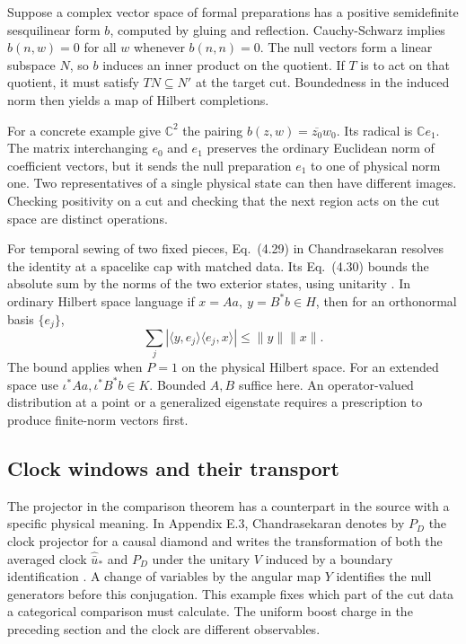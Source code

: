 \documentclass[11pt,letterpaper]{article}
\newcommand{\CC}{\mathbb C}
\begin{document}
Suppose a complex vector space of formal preparations has a
positive semidefinite sesquilinear form \(b\), computed by gluing and reflection.
Cauchy-Schwarz implies \(b(n,w)=0\) for all \(w\) whenever \(b(n,n)=0\).
The null vectors form a linear subspace \(N\), so \(b\) induces an inner
product on the quotient. If \(T\) is to act on that quotient, it must
satisfy \(T N\subseteq N'\) at the target cut. Boundedness in the induced
norm then yields a map of Hilbert completions.

For a concrete example give \(\CC^2\) the pairing
\(b(z,w)=\overline{z_0}w_0\). Its radical is \(\CC e_1\). The matrix
interchanging \(e_0\) and \(e_1\) preserves the ordinary Euclidean norm of
coefficient vectors, but it sends the null preparation \(e_1\) to one of
physical norm one. Two representatives of a single physical state can then
have different images. Checking positivity on a cut and checking that the
next region acts on the cut space are distinct operations.

For temporal sewing of two fixed pieces, Eq.~(4.29) in Chandrasekaran
resolves the identity at a spacelike cap with matched data. Its Eq.~(4.30)
bounds the absolute sum by the norms of the two exterior states, using
unitarity \cite[Sec.~4.4]{nc}. In ordinary Hilbert space language if
\(x=Aa,\ y=B^*b\in H\), then for an orthonormal basis \(\{e_j\}\),
\begin{equation}
 \sum_j|\langle y,e_j\rangle\langle e_j,x\rangle|
       \leq \|y\|\|x\|.
 \label{eq:cauchy}
\end{equation}
The bound applies when \(P=1\) on the physical Hilbert space. For an extended
space use \(\iota^*Aa,\iota^*B^*b\in K\). Bounded \(A,B\) suffice here.
An operator-valued distribution at a point or a generalized eigenstate
requires a prescription to produce finite-norm vectors first.

\subsection{Clock windows and their transport}
The projector in the comparison theorem has a counterpart in the source
with a specific physical meaning. In Appendix E.3, Chandrasekaran denotes
by \(P_D\) the clock projector for a causal diamond and writes the
transformation of both the averaged clock \(\widehat{\bar u}_*\) and
\(P_D\) under the unitary \(V\) induced by a boundary identification
\cite[Eq.~(E.16)]{nc}. A change of variables by the angular map \(Y\)
identifies the null generators before this conjugation. This example fixes
which part of the cut data a categorical comparison must calculate.
The uniform boost charge in the preceding section and the clock are
different observables.
\end{document}
